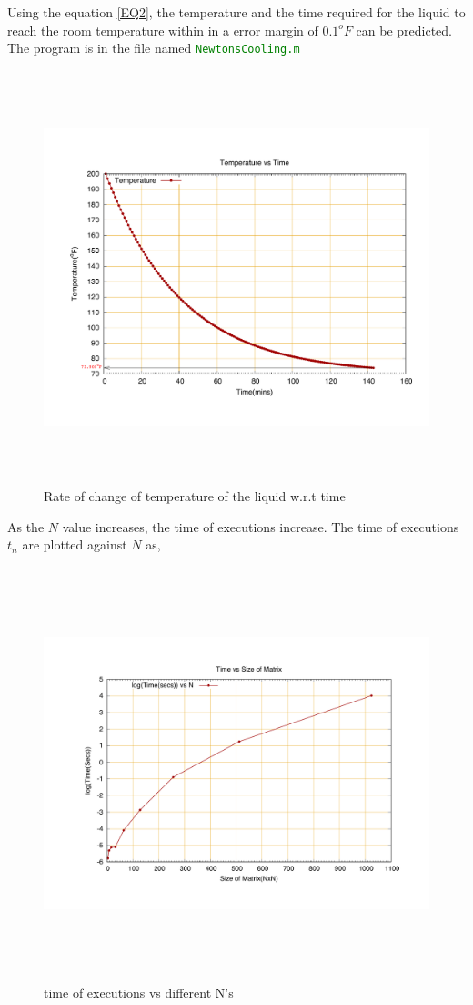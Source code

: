 \documentclass[fleqn,letterpaper,12pt]{report}
\begin{document}
Using the equation \eqref{EQ2}, the temperature and the time required for the liquid to reach the room temperature within in a error margin of $0.1^oF$ can be predicted. The program is in the file named {\tt{\textcolor{Green}{NewtonsCooling.m}}}
\begin{figure}[ht!]
	\centering
	\includegraphics[height=120mm,width=160mm]{T.pdf}
	\caption{Rate of change of temperature of the liquid w.r.t time\label{overflow}}
\end{figure}

\newpage
{}
{}
\problem

As the $N$ value increases, the time of executions increase. The time of executions $t_n$ are plotted against $N$ as,

\begin{figure}[ht!]
	\centering
	\includegraphics[height=120mm,width=160mm]{matrix_multiply.pdf}
	\caption{time of executions vs different N's\label{overflow}}
\end{figure}
\end{document}
